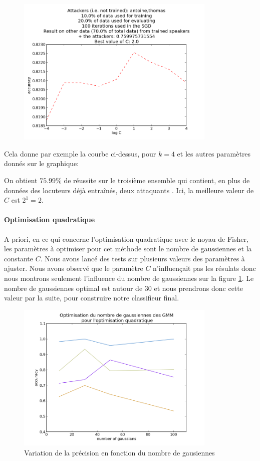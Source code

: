 \documentclass{article}
\begin{document}
\begin{figure}[!h]
\includegraphics[width=0.85\textwidth]{../bestC}
\end{figure}
Cela donne par exemple la courbe ci-dessus, pour $k=4$ et les autres paramètres donnés sur le graphique:

On obtient $75.99 \%$ de réussite sur le troisième ensemble qui contient, en plus de données des locuteurs déjà entraînés, deux \og attaquants \fg. Ici, la meilleure valeur de $C$ est $2^1 = 2$.

\paragraph{Optimisation quadratique}
A priori, en ce qui concerne l'optimisation quadratique avec le noyau de Fisher, les paramètres à optimiser pour cet méthode sont le nombre de gaussiennes et la constante $C$.
Nous avons lancé des tests sur plusieurs valeurs des paramètres à ajuster. Nous avons observé que le paramètre $C$ n'influençait pas les résulats donc nous montrons seulement l'influence du nombre de gaussiennes sur la figure \ref{opt_qp}. Le nombre de gaussiennes optimal est autour de 30 et nous prendrons donc cette valeur par la suite, pour construire notre classifieur final.

\begin{figure}[!h]
\includegraphics[width=0.85\textwidth]{img/opt_qp_pdf}
\caption{Variation de la précision en fonction du nombre de gausiennes}\label{opt_qp}
\end{figure}
\end{document}
